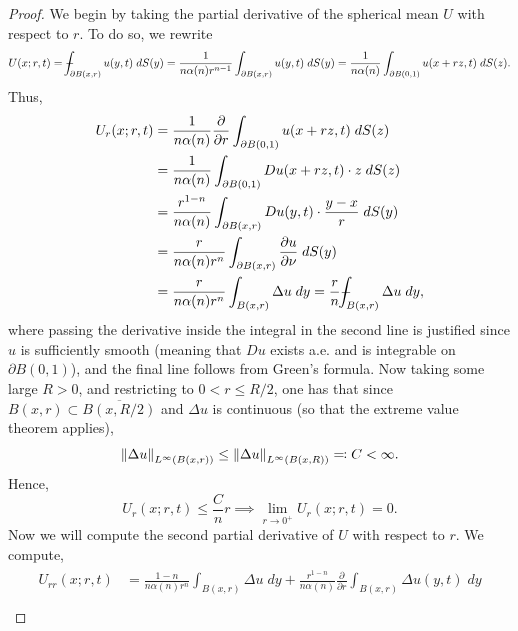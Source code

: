 \documentclass{article}
\def\Xint#1{\mathchoice
	{\XXint\displaystyle\textstyle{#1}}%
	{\XXint\textstyle\scriptstyle{#1}}%
	{\XXint\scriptstyle\scriptscriptstyle{#1}}%
	{\XXint\scriptscriptstyle\scriptscriptstyle{#1}}%
	\!\int}
\def\XXint#1#2#3{{\setbox0=\hbox{$#1{#2#3}{\int}$ }
		\vcenter{\hbox{$#2#3$ }}\kern-0.6\wd0}}
\def\dashint{\Xint-}
\begin{document}
\begin{proof}
	We begin by taking the partial derivative of the spherical mean $U$ with respect to $r$. To do so, we rewrite 
	\begin{equation*}
		U(x;r,t) = \dashint_{\partial B(x, r)}u(y,t)\;dS(y) = \frac{1}{n\alpha(n)r^{n-1}}\int_{\partial B(x, r)}u(y,t)\;dS(y) = \frac{1}{n\alpha(n)}\int_{\partial B(0,1)}u(x + rz, t)\;dS(z). 
	\end{equation*}
	Thus, 
	\begin{align*}
		\begin{split}
			U_{r}(x;r, t) &= \frac{1}{n\alpha(n)}\frac{\partial}{\partial r}\int_{\partial B(0,1)}u(x + rz, t)\;dS(z) \\
			&= \frac{1}{n\alpha(n)}\int_{\partial B(0,1)}Du(x + rz, t) \cdot z \;dS(z) \\
			&= \frac{r^{1-n}}{n\alpha(n)}\int_{\partial B(x, r)}Du(y, t) \cdot \frac{y -x}{r}\;dS(y) \\
			&= \frac{r}{n\alpha(n)r^{n}}\int_{\partial B(x, r)}\frac{\partial u}{\partial \nu}\;dS(y) \\
			&= \frac{r}{n\alpha(n)r^{n}}\int_{B(x, r)}\Delta u\;dy = \frac{r}{n}\dashint_{B(x, r)}\Delta u\;dy,
		\end{split}
	\end{align*}
	where passing the derivative inside the integral in the second line is justified since $u$ is sufficiently smooth (meaning that $Du$ exists a.e. and is integrable on $\partial B(0,1)$), and the final line follows from Green's formula. Now taking some large $R > 0$, and restricting to $0 < r \leq R/2$, one has that since $B(x,r) \subset \overline{B(x, R/2)}$ and $\Delta u$ is continuous (so that the extreme value theorem applies), 
	\begin{equation*}
		\left\Vert \Delta u \right\Vert_{L^{\infty}(B(x, r))} \leq \left\Vert \Delta u \right\Vert_{L^{\infty}(B(x, R))} \eqqcolon C < \infty. 
	\end{equation*}
	Hence, 
	\begin{equation*}
		U_{r}(x;r, t) \leq \frac{C}{n}r \implies \lim_{r \to 0^{+}}U_{r}(x;r, t) = 0.
	\end{equation*}
	Now we will compute the second partial derivative of $U$ with respect to $r$. We compute, 
	\begin{align*}
		\begin{split}
			U_{rr}(x;r, t) &= \frac{1 -n}{n\alpha(n)r^{n}}\int_{B(x, r)}\Delta u\;dy + \frac{r^{1-n}}{n\alpha(n)}\frac{\partial}{\partial r}\int_{B(x, r)}\Delta u(y,t)\;dy \\

\end{split}
\end{align*}
\end{proof}
\end{document}
